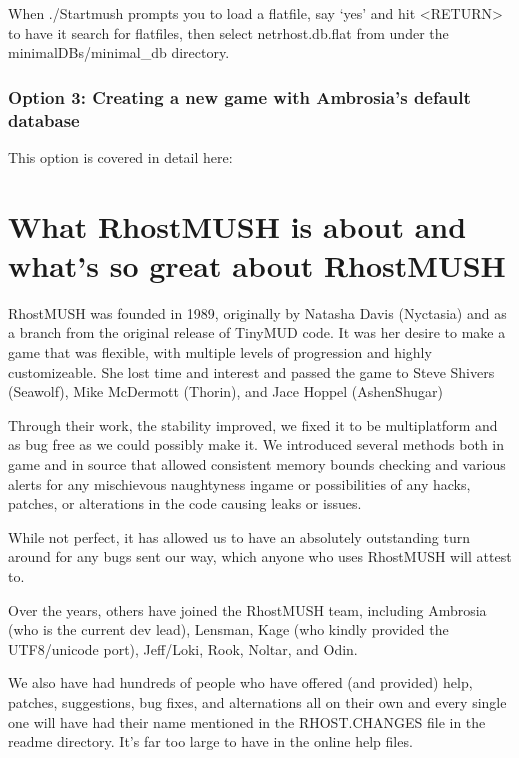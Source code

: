 \documentclass[letterpaper,10pt,english]{sphinxmanual}
\begin{document}
\sphinxAtStartPar
When ./Startmush prompts you to load a flatfile, say ‘yes’ and hit \textless{}RETURN\textgreater{}
to have it search for flatfiles, then select netrhost.db.flat from under
the minimal\sphinxhyphen{}DBs/minimal\_db directory.


\subsection{Option 3: Creating a new game with Ambrosia’s default database}
\label{\detokenize{install:option-3-creating-a-new-game-with-ambrosia-s-default-database}}
\sphinxAtStartPar
This option is covered in detail here: {\hyperref[\detokenize{ambrosiadb:ambrosiadb-installation}]{}}


\chapter{What RhostMUSH is about and what’s so great about RhostMUSH}
\label{\detokenize{features:what-rhostmush-is-about-and-what-s-so-great-about-rhostmush}}\label{\detokenize{features::doc}}
\sphinxAtStartPar
RhostMUSH was founded in 1989, originally by Natasha Davis (Nyctasia) and as
a branch from the original release of TinyMUD code.  It was her desire to make
a game that was flexible, with multiple levels of progression and highly
customizeable.  She lost time and interest and passed the game to
Steve Shivers (Seawolf), Mike McDermott (Thorin), and Jace Hoppel (Ashen\sphinxhyphen{}Shugar)

\sphinxAtStartPar
Through their work, the stability improved, we fixed it to be multi\sphinxhyphen{}platform
and as bug free as we could possibly make it.  We introduced several methods both
in game and in source that allowed consistent memory bounds checking and
various alerts for any mischievous naughtyness in\sphinxhyphen{}game or possibilities of any
hacks, patches, or alterations in the code causing leaks or issues.

\sphinxAtStartPar
While not perfect, it has allowed us to have an absolutely outstanding
turn around for any bugs sent our way, which anyone who uses RhostMUSH will
attest to.

\sphinxAtStartPar
Over the years, others have joined the RhostMUSH team, including Ambrosia
(who is the current dev lead), Lensman, Kage (who kindly provided the
UTF8/unicode port), Jeff/Loki, Rook, Noltar, and Odin.

\sphinxAtStartPar
We also have had hundreds of people who have offered (and provided) help,
patches, suggestions, bug fixes, and alternations all on their own and
every single one will have had their name mentioned in the RHOST.CHANGES
file in the readme directory.  It’s far too large to have in the online
help files.
\end{document}
